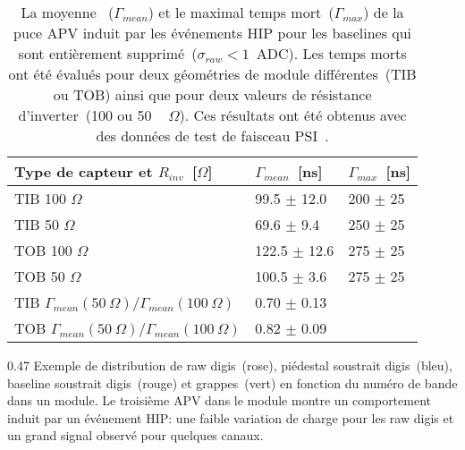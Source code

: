 \begin{table}[h]
\begin{center}
\begin{tabular}{|l|l|l|}
\hline
Type de capteur et $R_{inv}$~[$\Omega$] & $\Gamma_{mean}$~[ns]  & $\Gamma_{max}$~[ns] \\
\hline
\hline
TIB 100 $\Omega$ & 99.5 $\pm$ 12.0 & 200 $\pm$ 25 \\
TIB 50  $\Omega$ & 69.6 $\pm$ 9.4 & 250 $\pm$ 25 \\
TOB 100  $\Omega$ & 122.5 $\pm$ 12.6 & 275 $\pm$ 25 \\
TOB 50 $\Omega$  & 100.5 $\pm$ 3.6 & 275 $\pm$ 25 \\
\hline
TIB $\Gamma_{mean}(50~\Omega )/\Gamma_{mean}(100~\Omega)$ &  0.70 $\pm$ 0.13  & \\
TOB $\Gamma_{mean}(50~\Omega )/\Gamma_{mean}(100~\Omega)$ &  0.82 $\pm$ 0.09 & \\
\hline
\end{tabular}
\caption[Table caption text]{La moyenne~ ($\Gamma_{mean} $) et le maximal temps mort~($\Gamma_{max}$) de la puce APV induit par les événements HIP pour les baselines qui sont entièrement supprimé~($\sigma_{raw} <1 $~ADC). Les temps morts ont été évalués pour deux géométries de module différentes~(TIB ou TOB) ainsi que pour deux valeurs de résistance d'inverter~(100 ou 50 ~ $\Omega$). Ces résultats ont été obtenus avec des données de test de faisceau PSI~\cite{Bainbridge:2004jc}.}
\label{tab:tableDeadtimes2}
\end{center}
\end{table}


                 {0.47}
                 {Exemple de distribution de raw digis~(rose), piédestal soustrait digis~(bleu), baseline soustrait digis~(rouge) et grappes~(vert) en fonction du numéro de bande dans un module. Le troisième APV dans le module montre un comportement induit par un événement HIP: une faible variation de charge pour les raw digis et un grand signal observé pour quelques canaux.}       %

